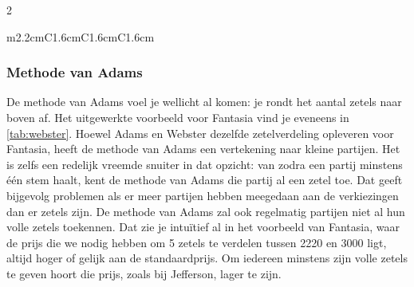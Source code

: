 \begin{multicols}{2}
\begin{tabel}
\begin{tabular}{m{2.2cm}C{1.6cm}C{1.6cm}C{1.6cm}}
			\hlinethick
		\end{tabular}
		\caption{Zetelverdeling volgens de methode Jefferson, Webster \& Adams}\label{tab:webster}
\end{tabel}
\subsubsection{Methode van Adams}
De methode van Adams voel je wellicht al komen: je rondt het aantal zetels naar boven af. Het uitgewerkte voorbeeld voor Fantasia vind je eveneens in \autoref{tab:webster}. Hoewel Adams en Webster dezelfde zetelverdeling opleveren voor Fantasia, heeft de methode van Adams een vertekening naar kleine partijen. Het is zelfs een redelijk vreemde snuiter in dat opzicht: van zodra een partij minstens één stem haalt, kent de methode van Adams die partij al een zetel toe. Dat geeft bijgevolg problemen als er meer partijen hebben meegedaan aan de verkiezingen dan er zetels zijn.
De methode van Adams zal ook regelmatig partijen niet al hun volle zetels toekennen. Dat zie je intuïtief al in het voorbeeld van Fantasia, waar de prijs die we nodig hebben om 5 zetels te verdelen tussen 2220 en 3000 ligt, altijd hoger of gelijk aan de standaardprijs. Om iedereen minstens zijn volle zetels te geven hoort die prijs, zoals bij Jefferson, lager te zijn. 






\end{multicols}
